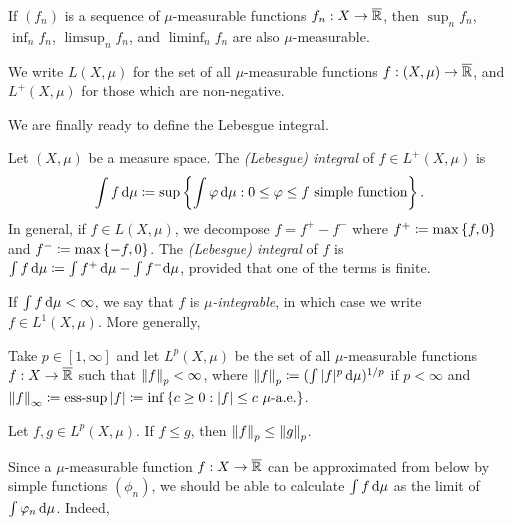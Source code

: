 \documentclass[reqno, twoside]{article}
\begin{document}
    \begin{exercise}
        If $(f_n)$ is a sequence of $\mu$-measurable functions $f_n:X\to\overline{\mathbb{R}}$, then $\sup_nf_n$, $\inf_nf_n$, $\limsup_nf_n$, and $\liminf_nf_n$ are also $\mu$-measurable.
    \end{exercise}

    \begin{notation}
        We write $L(X,\mu)$ for the set of all $\mu$-measurable functions $f:(X,\mu)\to\overline{\mathbb{R}}$, and $L^+(X,\mu)$ for those which are non-negative.
    \end{notation}

    We are finally ready to define the Lebesgue integral.

    \begin{definition}
        Let $(X,\mu)$ be a measure space. The \textit{(Lebesgue) integral} of $f\in L^+(X,\mu)$ is
        \vspace{-0.05in}
        \begin{equation*}
            \int f\,\d\mu\coloneqq\sup\l\{\int\phi\,\d\mu\st0\leq\phi\leq f\textrm{ simple function}\r\}.
            \vspace{-0.05in}
        \end{equation*}
        In general, if $f\in L(X,\mu)$, we decompose $f=f^+-f^-$ where $f^+\coloneqq\max\left\{f,0\right\}$ and $f^-\coloneqq\max\left\{-f,0\right\}$. The \textit{(Lebesgue) integral} of $f$ is $\int f\,\mathrm{d}\mu\coloneqq\int f^+\,\mathrm{d}\mu-\int f^-\mathrm{d}\mu$, provided that one of the terms is finite.
    \end{definition}

    If $\int f\,\mathrm{d}\mu<\infty$, we say that $f$ is \textit{$\mu$-integrable}, in which case we write $f\in L^1(X,\mu)$. More generally,

    \begin{definition}
        Take $p\in[1,\infty]$ and let $L^p(X,\mu)$ be the set of all $\mu$-measurable functions $f:X\to\overline{\mathbb{R}}$ such that $\left\|f\right\|_p<\infty$, where $\left\|f\right\|_p\coloneqq(\int|f|^p\,\mathrm{d}\mu)^{1/p}$ if $p<\infty$ and $\left\|f\right\|_\infty\coloneqq\operatorname{ess-sup}|f|\coloneqq\inf\left\{c\geq0:|f|\leq c\textrm{ $\mu$-a.e.}\right\}$.
    \end{definition}

    \begin{exercise}
        Let $f,g\in L^p(X,\mu)$. If $f\leq g$, then $\left\|f\right\|_p\leq\left\|g\right\|_p$.
    \end{exercise}

    Since a $\mu$-measurable function $f:X\to\overline{\mathbb{R}}$ can be approximated from below by simple functions $(\phi_n)$, we should be able to calculate $\int f\,\mathrm{d}\mu$ as the limit of $\int\varphi_n\,\mathrm{d}\mu$. Indeed,
\end{document}
